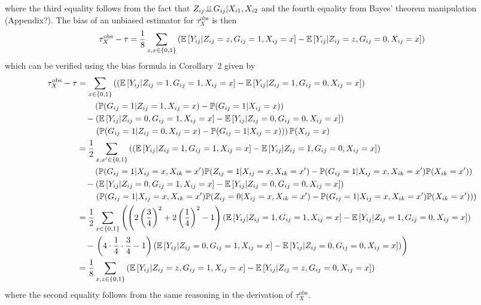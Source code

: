 \documentclass[10pt]{article}
\begin{document}
where the third equality follows from the fact that $Z_{ij}{\perp\!\!\!\perp} G_{ij}|X_{i1},X_{i2}$ and the fourth equality from Bayes' theorem manipulation (\todo Appendix?). The bias of an unbiased estimator for $\tau_{X}^\text{obs}$ is then
\[
\tau_{X}^\text{obs} - \tau = \frac{1}{8}\sum_{z,x\in\{0,1\}}\left(\mathbb{E}\left[Y_{ij}|Z_{ij}=z,G_{ij}=1,X_{ij}=x\right] - \mathbb{E}\left[Y_{ij}|Z_{ij}=z,G_{ij}=0,X_{ij}=x\right]\right)
\]
which can be verified using the bias formula in Corollary~2 given by
\begin{align*}
\tau_{X}^\text{obs} - \tau &= \sum_{x\in\{0,1\}} \left(\left(\mathbb{E}\left[Y_{ij}|Z_{ij}=1,G_{ij}=1,X_{ij}=x\right] - \mathbb{E}\left[Y_{ij}|Z_{ij}=1,G_{ij}=0,X_{ij}=x\right]\right)\right. \\
&\qquad \left(\mathbb{P}(G_{ij}=1|Z_{ij}=1,X_{ij}=x)-\mathbb{P}(G_{ij}=1|X_{ij}=x)\right) \\
&\quad - \left(\mathbb{E}\left[Y_{ij}|Z_{ij}=0,G_{ij}=1,X_{ij}=x\right] - \mathbb{E}\left[Y_{ij}|Z_{ij}=0,G_{ij}=0,X_{ij}=x\right]\right) \\
&\qquad \left.\left(\mathbb{P}(G_{ij}=1|Z_{ij}=0,X_{ij}=x)-\mathbb{P}(G_{ij}=1|X_{ij}=x)\right)\right)\mathbb{P}(X_{ij}=x) \\
&= \frac{1}{2}\sum_{x,x'\in\{0,1\}} \left(\left(\mathbb{E}\left[Y_{ij}|Z_{ij}=1,G_{ij}=1,X_{ij}=x\right] - \mathbb{E}\left[Y_{ij}|Z_{ij}=1,G_{ij}=0,X_{ij}=x\right]\right)\right. \\
&\qquad \left(\mathbb{P}(G_{ij}=1|X_{ij}=x,X_{ik}=x')\mathbb{P}(Z_{ij}=1|X_{ij}=x,X_{ik}=x')-\mathbb{P}(G_{ij}=1|X_{ij}=x,X_{ik}=x')\mathbb{P}(X_{ik}=x')\right) \\
&\quad - \left(\mathbb{E}\left[Y_{ij}|Z_{ij}=0,G_{ij}=1,X_{ij}=x\right] - \mathbb{E}\left[Y_{ij}|Z_{ij}=0,G_{ij}=0,X_{ij}=x\right]\right) \\
&\qquad \left.\left(\mathbb{P}(G_{ij}=1|X_{ij}=x,X_{ik}=x')\mathbb{P}(Z_{ij}=0|X_{ij}=x,X_{ik}=x')-\mathbb{P}(G_{ij}=1|X_{ij}=x,X_{ik}=x')\mathbb{P}(X_{ik}=x')\right)\right) \\
&= \frac{1}{2}\sum_{x\in\{0,1\}}\left(\left(2\left(\frac{3}{4}\right)^2+2\left(\frac{1}{4}\right)^2 - 1\right)\left(\mathbb{E}\left[Y_{ij}|Z_{ij}=1,G_{ij}=1,X_{ij}=x\right] - \mathbb{E}\left[Y_{ij}|Z_{ij}=1,G_{ij}=0,X_{ij}=x\right]\right)\right. \\
&\quad - \left.\left(4\cdot\frac{1}{4}\cdot\frac{3}{4} - 1\right)\left(\mathbb{E}\left[Y_{ij}|Z_{ij}=0,G_{ij}=1,X_{ij}=x\right] - \mathbb{E}\left[Y_{ij}|Z_{ij}=0,G_{ij}=0,X_{ij}=x\right]\right)\right) \\
&= \frac{1}{8}\sum_{x,z\in\{0,1\}}\left(\mathbb{E}\left[Y_{ij}|Z_{ij}=z,G_{ij}=1,X_{ij}=x\right] - \mathbb{E}\left[Y_{ij}|Z_{ij}=z,G_{ij}=0,X_{ij}=x\right]\right)
\end{align*}
where the second equality follows from the same reasoning in the derivation of $\tau_X^\text{obs}$.
\end{document}
